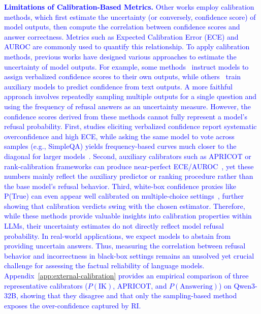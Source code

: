 \documentclass{article} %
\theoremstyle{definition}
\newcommand{\wigglyblue}[1]{\textcolor{blue}{#1}}
\begin{document}
\noindent\wigglyblue{\textbf{Limitations of Calibration-Based Metrics.} 
Other works employ calibration methods, which first estimate the uncertainty (or conversely, confidence score) of model outputs, then compute the correlation between confidence scores and answer correctness.
Metrics such as Expected Calibration Error (ECE) and AUROC are commonly used to quantify this relationship.
To apply calibration methods, previous works have designed various approaches to estimate the uncertainty of model outputs. 
For example, some methods~\citep{xiong2023can} instruct models to assign verbalized confidence scores to their own outputs, while others~\citep{ulmer-etal-2024-calibrating} train auxiliary models to predict confidence from text outputs. 
A more faithful approach involves repeatedly sampling multiple outputs for a single question and using the frequency of refusal answers as an uncertainty measure.
However, the confidence scores derived from these methods cannot fully represent a model's refusal probability. 
First, studies eliciting verbalized confidence report systematic overconfidence and high ECE, while asking the same model to vote across samples (e.g., SimpleQA) yields frequency-based curves much closer to the diagonal for larger models~\citep{xiong2023can,wei2024measuringshortformfactualitylarge}. 
Second, auxiliary calibrators such as APRICOT or rank-calibration frameworks can produce near-perfect ECE/AUROC~\citep{ulmer-etal-2024-calibrating,huang-etal-2024-rank}, yet these numbers mainly reflect the auxiliary predictor or ranking procedure rather than the base model's refusal behavior. 
Third, white-box confidence proxies like P(True) can even appear well calibrated on multiple-choice settings~\citep{kadavath2022mostly}, further showing that calibration verdicts swing with the chosen estimator. 
Therefore, while these methods provide valuable insights into calibration properties within LLMs, their uncertainty estimates do not directly reflect model refusal probability. 
In real-world applications, we expect models to abstain from providing uncertain answers. 
Thus, measuring the correlation between refusal behavior and incorrectness in black-box settings remains an unsolved yet crucial challenge for assessing the factual reliability of language models. Appendix~\ref{app:external-calibration} provides an empirical comparison of three representative calibrators ($P(\mathrm{IK})$, APRICOT, and $P(\mathrm{Answering})$) on Qwen3-32B, showing that they disagree and that only the sampling-based method exposes the over-confidence captured by RI.}
\end{document}
